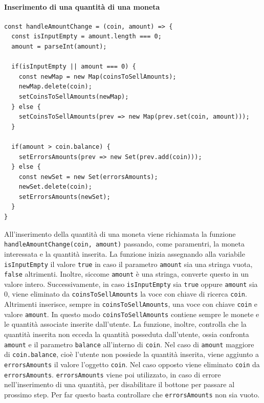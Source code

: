 \documentclass[a4paper]{article}
\begin{document}
        \paragraph{Inserimento di una quantità di una moneta}
        \label{insertCoinsToSell}
        \begin{lstlisting}[style=ES6, title={Funzione handleAmountChange}]
const handleAmountChange = (coin, amount) => {
  const isInputEmpty = amount.length === 0;
  amount = parseInt(amount);

  if(isInputEmpty || amount === 0) {
    const newMap = new Map(coinsToSellAmounts);
    newMap.delete(coin);
    setCoinsToSellAmounts(newMap);
  } else {
    setCoinsToSellAmounts(prev => new Map(prev.set(coin, amount)));
  }

  if(amount > coin.balance) {
    setErrorsAmounts(prev => new Set(prev.add(coin)));
  } else {
    const newSet = new Set(errorsAmounts);
    newSet.delete(coin);
    setErrorsAmounts(newSet);
  }
}\end{lstlisting}
        All'inserimento della quantità di una moneta viene richiamata la funzione \verb|handleAmountChange(coin, amount)| passando, come paramentri, la moneta interessata e la quantità inserita.
        \newline
        La funzione inizia assegnando alla variabile \verb|isInputEmpty| il valore \verb|true| in caso il parametro \verb|amount| sia una stringa vuota, \verb|false| altrimenti. Inoltre, siccome \verb|amount| è una stringa, converte questo in un valore intero.
        \newline
        Successivamente, in caso \verb|isInputEmpty| sia \verb|true| oppure \verb|amount| sia 0, viene eliminato da \verb|coinsToSellAmounts| la voce con chiave di ricerca \verb|coin|. Altrimenti inserisce, sempre in \verb|coinsToSellAmounts|, una voce con chiave \verb|coin| e valore \verb|amount|.
        In questo modo \verb|coinsToSellAmounts| contiene sempre le monete e le quantità associate inserite dall'utente.
        \newline
        La funzione, inoltre, controlla che la quantità inserita non ecceda la quantità posseduta dall'utente, ossia confronta \verb|amount| e il parametro \verb|balance| all'interno di \verb|coin|.
        \newline
        Nel caso di \verb|amount| maggiore di \verb|coin.balance|, cioè l'utente non possiede la quantità inserita, viene aggiunto a \verb|errorsAmounts| il valore l'oggetto \verb|coin|.
        Nel caso opposto viene eliminato \verb|coin| da \verb|errorsAmounts|. \verb|errorsAmounts| viene poi utilizzato, in caso di errore nell'inserimento di una quantità, per disabilitare il bottone per passare al prossimo step.
        Per far questo basta controllare che \verb|errorsAmounts| non sia vuoto.
\end{document}
